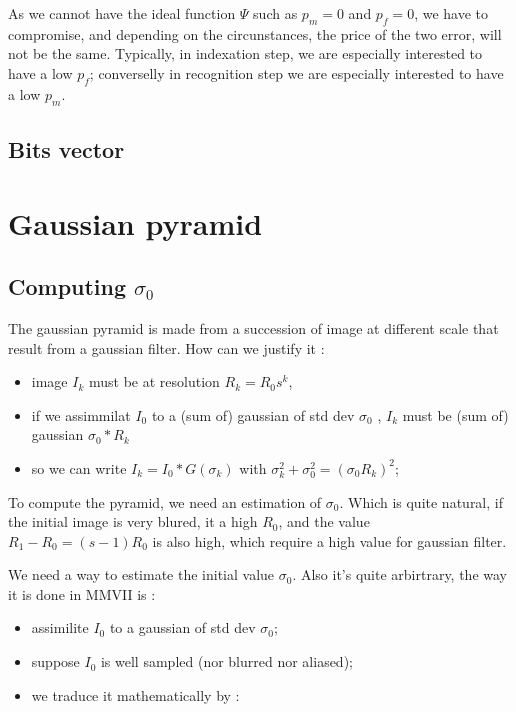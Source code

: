 As we cannot have the ideal function $\Psi $ such as $p_m=0$ and $p_f=0$,
we have to compromise, and depending on the circunstances, the price of the
two error, will not be the same. Typically, in indexation step,  we are especially
interested to have a low $p_f$; converselly in recognition step we are
especially interested to have a low  $p_m$.


\subsection{Bits vector}


\section{Gaussian pyramid}

\subsection{Computing $\sigma_0$}

The gaussian pyramid is made from a succession of image at different scale that
result from a gaussian filter. How can we justify it :

\begin {itemize} 
   \item  image $I_k$ must be at resolution  $R_k =  R_0 s ^k$,
   \item if we assimmilat  $I_0$ to a (sum of) gaussian of std dev $\sigma_0$  , $I_k$
         must be (sum of)  gaussian  $\sigma_0 * R_k$ 
   \item so we can write $I_k = I_0 \ast G(\sigma_k)$ with $\sigma_k^2 + \sigma_0^2 = (\sigma_0  R_k)^2$;
\end {itemize} 

To compute the pyramid, we need an estimation of $\sigma_0$. Which is quite natural, if the initial
image is very blured, it a high $R_0$, and the value $R_1-R_0 = (s-1)R_0$ is also high, which require
a high value for gaussian filter.

We need a way to estimate the initial value $\sigma_0$. Also it's quite arbirtrary, the way it is
done in MMVII is :


\begin {itemize} 
   \item  assimilite $I_0$ to a gaussian of  std dev $\sigma_0$;
   \item  suppose $I_0$ is well sampled (nor blurred nor aliased);
   \item we traduce it mathematically by  :
\end {itemize} 

